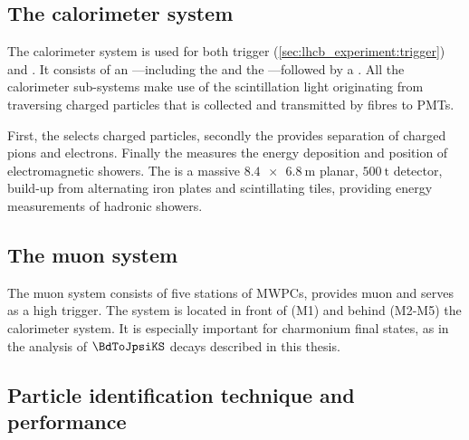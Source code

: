 \subsection{The calorimeter system}
\label{sec:lhcb_experiment:pid:calo}

The \LHCb calorimeter system is used for both trigger
(\cref{sec:lhcb_experiment:trigger}) and \PID. It consists of an
\ECAL---including the \SPD and the \PS---followed by a \HCAL. All the
calorimeter sub-systems make use of the scintillation light originating from
traversing charged particles that is collected and transmitted by fibres to
\acp{PMT}.

First, the \SPD selects charged particles, secondly the \PS provides separation
of charged pions and electrons. Finally the \ECAL measures the energy deposition
and position of electromagnetic showers. The \HCAL is a massive
$\SI[product-units = power]{8.4 x 6.8}{\metre}$ planar, $\SI{500}{\tonne}$
detector, build-up from alternating iron plates and scintillating tiles,
providing energy measurements of hadronic showers.

\subsection{The muon system}
\label{sec:lhcb_experiment:pid:muon}

The muon system consists of five stations of \acp{MWPC}, provides muon \PID and
serves as a high \pT trigger. The system is located in front of (M1) and behind
(M2-M5) the calorimeter system. It is especially important for charmonium final
states, as in the analysis of $\BdToJpsiKS$ decays described in this thesis.

\subsection{Particle identification technique and performance}

